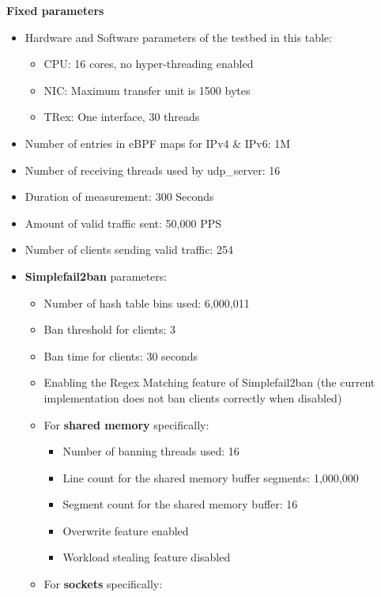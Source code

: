 \bigskip
\noindent
\textbf{Fixed parameters}
\begin{itemize}
    \item Hardware and Software parameters of the testbed in this table\@:
    \begin{itemize}
        \item \ac{CPU}\@: 16 cores, no hyper-threading enabled
        \item \ac{NIC}\@: Maximum transfer unit is 1500 bytes
        \item TRex\@: One interface, 30 threads
    \end{itemize}
    \item Number of entries in \ac{eBPF} maps for IPv4 \& IPv6\@: 1M
    \item Number of receiving threads used by udp\_server\@: 16
    \item Duration of measurement\@: 300 Seconds
    \item Amount of valid traffic sent\@: 50,000 \ac{PPS}
    \item Number of clients sending valid traffic\@: 254
    \item \textbf{Simplefail2ban} parameters\@:
    \begin{itemize}
        \item Number of hash table bins used\@: 6,000,011
        \item Ban threshold for clients\@: 3
        \item Ban time for clients\@: 30 seconds
        \item Enabling the \ac{Regex} Matching feature of Simplefail2ban (the current implementation does not ban clients correctly when disabled)
        \item For \textbf{shared memory} specifically\@:
        \begin{itemize}
            \item Number of banning threads used\@: 16
            \item Line count for the shared memory buffer segments\@: 1,000,000
            \item Segment count for the shared memory buffer\@: 16
            \item Overwrite feature enabled
            \item Workload stealing feature disabled
        \end{itemize}
        \item For \textbf{sockets} specifically\@:
        \begin{itemize}

\end{itemize}
\end{itemize}
\end{itemize}

